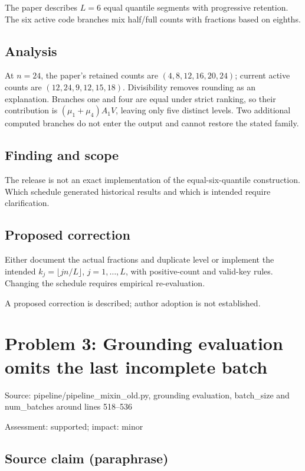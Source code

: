\documentclass[11pt]{article}
\begin{document}
The paper describes \(L=6\) equal quantile segments with progressive retention. The six active code branches mix half/full counts with fractions based on eighths.

\subsection*{Analysis}

At \(n=24\), the paper’s retained counts are \((4,8,12,16,20,24)\); current active counts are \((12,24,9,12,15,18)\). Divisibility removes rounding as an explanation. Branches one and four are equal under strict ranking, so their contribution is \((\mu_1+\mu_4)A_1V\), leaving only five distinct levels. Two additional computed branches do not enter the output and cannot restore the stated family.

\subsection*{Finding and scope}

The release is not an exact implementation of the equal-six-quantile construction. Which schedule generated historical results and which is intended require clarification.

\subsection*{Proposed correction}

Either document the actual fractions and duplicate level or implement the intended \(k_j=\lfloor jn/L\rfloor\), \(j=1,\ldots,L\), with positive-count and valid-key rules. Changing the schedule requires empirical re-evaluation.

A proposed correction is described; author adoption is not established.

\section*{Problem 3: Grounding evaluation omits the last incomplete batch}

Source: pipeline/pipeline\_mixin\_old.py, grounding evaluation, batch\_size and num\_batches around lines 518–536

Assessment: supported; impact: minor

\subsection*{Source claim (paraphrase)}
\end{document}
